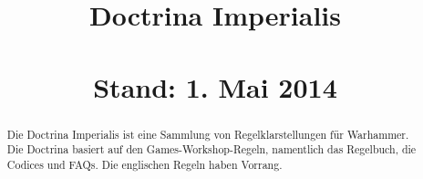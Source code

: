 \documentclass[a4paper,10pt, parskip, german]{scrartcl}
\title{
Doctrina Imperialis \\
\normalsize{~\\ Stand: 1. Mai 2014}
}
\author{}
\date{\vspace{-5ex}}
\begin{document}
\sffamily

\maketitle

\begin{abstract}
Die Doctrina Imperialis ist eine Sammlung von Regelklarstellungen für Warhammer.
Die Doctrina basiert auf den Games-Workshop-Regeln, namentlich das Regelbuch,
die Codices und FAQs. Die englischen Regeln haben Vorrang.
\end{abstract}

\tableofcontents

\newpage

%
%


\newpage
%
%


\newpage
%
%

\end{document}
